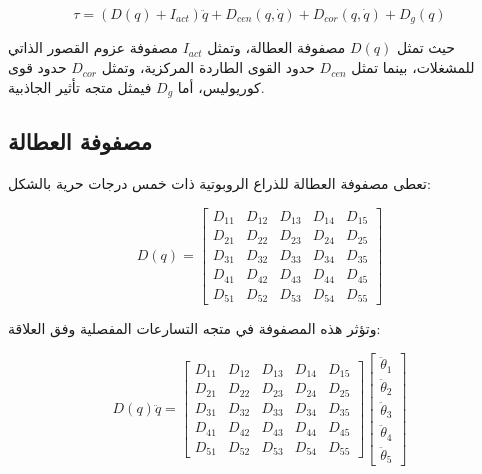 \begin{equation}
\tau =
\left(
D(q) + I_{act}
\right)\ddot{q}
+
D_{cen}(q,\dot{q})
+
D_{cor}(q,\dot{q})
+
D_g(q)
\end{equation}

حيث تمثل $D(q)$ مصفوفة العطالة، وتمثل $I_{act}$ مصفوفة عزوم القصور الذاتي للمشغلات، بينما تمثل $D_{cen}$ حدود القوى الطاردة المركزية، وتمثل $D_{cor}$ حدود قوى كوريوليس، أما $D_g$ فيمثل متجه تأثير الجاذبية.

\subsection*{مصفوفة العطالة}

تعطى مصفوفة العطالة للذراع الروبوتية ذات خمس درجات حرية بالشكل:

\begin{equation}
D(q)=
\begin{bmatrix}
D_{11} & D_{12} & D_{13} & D_{14} & D_{15} \\
D_{21} & D_{22} & D_{23} & D_{24} & D_{25} \\
D_{31} & D_{32} & D_{33} & D_{34} & D_{35} \\
D_{41} & D_{42} & D_{43} & D_{44} & D_{45} \\
D_{51} & D_{52} & D_{53} & D_{54} & D_{55}
\end{bmatrix}
\end{equation}

وتؤثر هذه المصفوفة في متجه التسارعات المفصلية وفق العلاقة:

\begin{equation}
D(q)\ddot{q} =
\begin{bmatrix}
D_{11} & D_{12} & D_{13} & D_{14} & D_{15} \\
D_{21} & D_{22} & D_{23} & D_{24} & D_{25} \\
D_{31} & D_{32} & D_{33} & D_{34} & D_{35} \\
D_{41} & D_{42} & D_{43} & D_{44} & D_{45} \\
D_{51} & D_{52} & D_{53} & D_{54} & D_{55}
\end{bmatrix}
\begin{bmatrix}
\ddot{\theta}_1 \\
\ddot{\theta}_2 \\
\ddot{\theta}_3 \\
\ddot{\theta}_4 \\
\ddot{\theta}_5
\end{bmatrix}
\end{equation}

